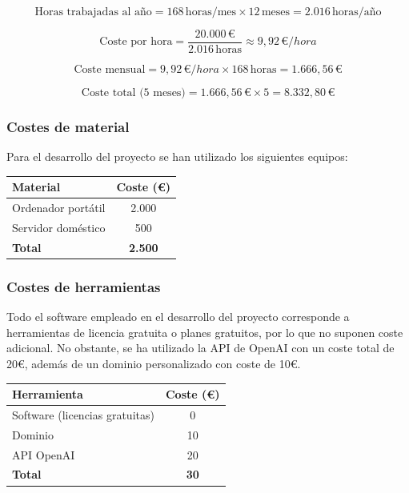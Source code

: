 \begin{equation*}
\text{Horas trabajadas al año} = 168\,\text{horas/mes} \times 12\,\text{meses} = 2.016\,\text{horas/año}
\end{equation*}

\begin{equation*}
\text{Coste por hora} = \frac{20.000\,€}{2.016\,\text{horas}} \approx 9,92\,€/hora
\end{equation*}

\begin{equation*}
\text{Coste mensual} = 9,92\,€/hora \times 168\,\text{horas} = 1.666,56\,€
\end{equation*}

\begin{equation*}
\text{Coste total (5 meses)} = 1.666,56\,€ \times 5 = 8.332,80\,€
\end{equation*}

\subsubsection{Costes de material}

Para el desarrollo del proyecto se han utilizado los siguientes equipos:

\begin{center}
\begin{tabular}{|l|c|}
\hline
\textbf{Material} & \textbf{Coste (€)} \\
\hline
Ordenador portátil & 2.000 \\
Servidor doméstico & 500 \\
\hline
\textbf{Total} & \textbf{2.500} \\
\hline
\end{tabular}
\end{center}

\subsubsection{Costes de herramientas}

Todo el software empleado en el desarrollo del proyecto corresponde a herramientas de licencia gratuita o planes gratuitos, por lo que no suponen coste adicional. No obstante, se ha utilizado la API de OpenAI con un coste total de 20€, además de un dominio personalizado con coste de 10€.

\begin{center}
\begin{tabular}{|l|c|}
\hline
\textbf{Herramienta} & \textbf{Coste (€)} \\
\hline
Software (licencias gratuitas) & 0 \\
Dominio & 10 \\
API OpenAI & 20 \\
\hline
\textbf{Total} & \textbf{30} \\
\hline
\end{tabular}
\end{center}


